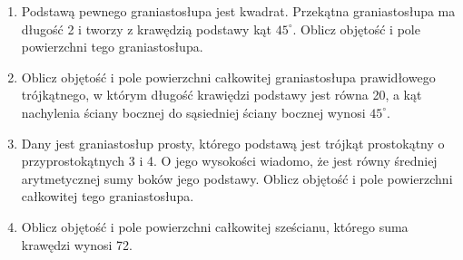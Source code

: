 \documentclass[12pt,a4paper]{article}
\begin{document}
\begin{enumerate}[1.]
	\item Podstawą pewnego graniastosłupa jest kwadrat. Przekątna graniastosłupa ma długość 2 i tworzy z krawędzią podstawy kąt $45^\circ$. Oblicz objętość i pole powierzchni tego graniastosłupa.
	
	\item Oblicz objętość i pole powierzchni całkowitej graniastosłupa prawidłowego trójkątnego, w którym długość krawiędzi podstawy jest równa 20, a kąt nachylenia ściany bocznej do sąsiedniej ściany bocznej wynosi $45^\circ$.
	
	\item Dany jest graniastosłup prosty, którego podstawą jest trójkąt prostokątny o przyprostokątnych 3 i 4. O jego wysokości wiadomo, że jest równy średniej arytmetycznej sumy boków jego podstawy. Oblicz objętość i pole powierzchni całkowitej tego graniastosłupa.
	
	\item Oblicz objętość i pole powierzchni całkowitej sześcianu, którego suma krawędzi wynosi 72.
\end{enumerate}
	
	
	
\end{document}

